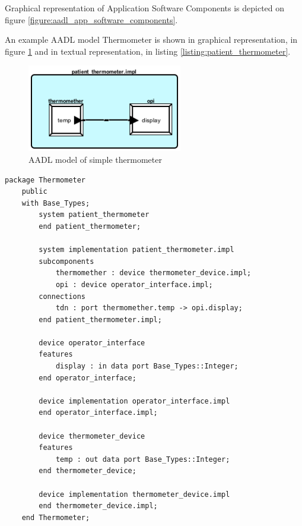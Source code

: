 Graphical representation of Application Software Components is depicted on figure \ref{figure:aadl_app_software_components}.

An example AADL model Thermometer is shown in graphical representation, in figure \ref{figure:patient_thermometer} and in textual representation, in listing \ref{listing:patient_thermometer}.

\begin{figure}[ht]%
    \begin{center}
    	\includegraphics[height=1.5in]{figures/patient_thermometer.png}    	
    \end{center}
    \caption{AADL model of simple thermometer}
    \label{figure:patient_thermometer}
\end{figure}

\singlespacing
\begin{lstlisting}[language=aadl, frame=single, gobble=0, caption={AADL model of simple thermometer}, label={listing:patient_thermometer}]
	package Thermometer
	public
	with Base_Types;
		system patient_thermometer
		end patient_thermometer;

		system implementation patient_thermometer.impl
		subcomponents
			thermomether : device thermometer_device.impl;
			opi : device operator_interface.impl;
		connections
			tdn : port thermomether.temp -> opi.display;
		end patient_thermometer.impl;

		device operator_interface
		features
			display : in data port Base_Types::Integer;
		end operator_interface;

		device implementation operator_interface.impl
		end operator_interface.impl;

		device thermometer_device
		features
			temp : out data port Base_Types::Integer;
		end thermometer_device;

		device implementation thermometer_device.impl
		end thermometer_device.impl;
	end Thermometer;
\end{lstlisting} 
\doublespacing

